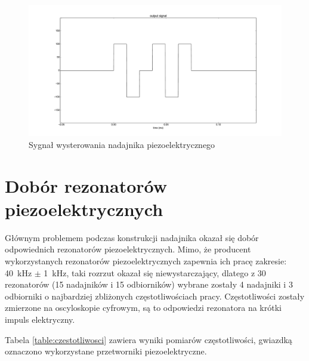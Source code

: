 \begin{figure}[h!]
    \centering
    \includegraphics[width=1.15\textwidth, trim= 47mm 0mm 0mm 0mm,clip]{output_signal}
    \caption{Sygnał wysterowania nadajnika piezoelektrycznego}
    \label{fig:output_signal}
\end{figure}

\newpage

\section{Dobór rezonatorów piezoelektrycznych}

Głównym problemem podczas konstrukcji nadajnika okazał się dobór odpowiednich rezonatorów piezoelektrycznych.
Mimo, że producent wykorzystanych rezonatorów piezoelektrycznych zapewnia ich pracę zakresie: \SI{40}{kHz} $\pm$ \SI{1}{kHz}, taki rozrzut okazał się niewystarczający, 
dlatego z 30 rezonatorów (15 nadajników i 15 odbiorników) wybrane zostały 4 nadajniki i 3 odbiorniki o najbardziej 
zbliżonych częstotliwościach pracy. Częstotliwości zostały zmierzone na oscyloskopie cyfrowym, są to odpowiedzi 
rezonatora na krótki impuls elektryczny.

Tabela \ref{table:czestotliwosci} zawiera wyniki pomiarów częstotliwości, gwiazdką oznaczono wykorzystane przetworniki piezoelektryczne.

